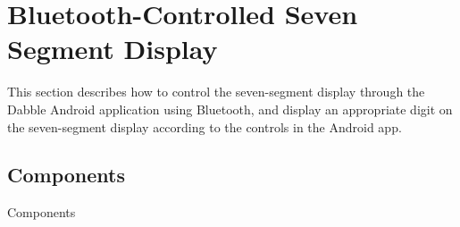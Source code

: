 \section{Bluetooth-Controlled Seven Segment Display}
This section describes how to control the seven-segment display through the
Dabble Android application using Bluetooth, and display an appropriate digit on
the seven-segment display according to the controls in the Android app.

\subsection{Components}
\begin{table}[!ht]
\centering

\caption{Components}
\label{table:ble-components}
\end{table}
